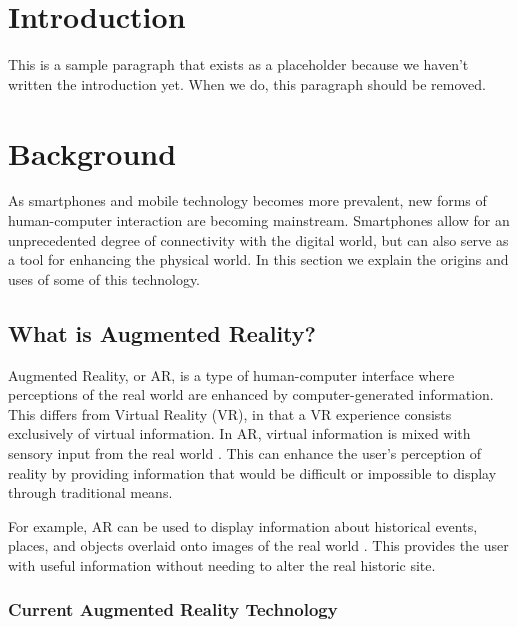 \documentclass[a4paper, 10pt, american, titlepage]{article}
\begin{document}

\section{Introduction}
\label{sec:introduction}

This is a sample paragraph that exists as a placeholder because
we haven't written the introduction yet. When we do, this paragraph should be
removed.

\section{Background}
\label{sec:background}

As smartphones and mobile technology becomes more prevalent,
new forms of human-computer interaction are becoming mainstream. Smartphones
allow for an unprecedented degree of connectivity with the digital world, but
can also serve as a tool for enhancing the physical world. In this section we
explain the origins and uses of some of this technology.

\subsection{What is Augmented Reality?}
\label{sec:whatIsAugmentedReality}

Augmented Reality, or AR, is a type of human-computer interface where
perceptions of the real world are enhanced by computer-generated information.
This differs from Virtual Reality (VR), in that a VR experience consists
exclusively of virtual information. In AR, virtual information is mixed with
sensory input from the real world \autocite{carmigniani2011}. This can enhance
the user's perception of reality by providing information that would be
difficult or impossible to display through traditional means.

For example, AR can be used to display information about historical events,
places, and objects overlaid onto images of the real world
\autocite{saenz2009}.  This provides the user with useful information without
needing to alter the real historic site.

\subsubsection{Current Augmented Reality Technology}
\label{sec:currentAugmentedRealityTechnology}
\end{document}
